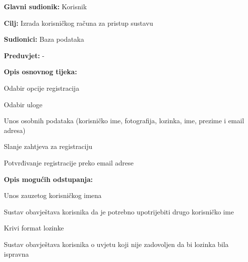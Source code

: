 					\noindent {}
					\begin{packed_item}
						
						\item \textbf{Glavni sudionik: }Korisnik
						\item  \textbf{Cilj:} Izrada korisničkog računa za pristup sustavu
						\item  \textbf{Sudionici:} Baza podataka
						\item  \textbf{Preduvjet:} -
						\item  \textbf{Opis osnovnog tijeka:}
						
						\item[] \begin{packed_enum}
							
							\item Odabir opcije registracija
							\item Odabir uloge
							\item Unos osobnih podataka (korisničko ime, fotografija, lozinka, ime, prezime i email adresa)
							\item Slanje zahtjeva za registraciju
							\item Potvrđivanje registracije preko email adrese
						
								\end{packed_enum}
								
						\item  \textbf{Opis mogućih odstupanja:}
						
						\item[] \begin{packed_item}
							
							\item[3.a] Unos zauzetog korisničkog imena \begin{packed_enum}
								
								\item Sustav obavještava korisnika da je potrebno upotrijebiti drugo korisničko ime
								
								\end{packed_enum}
							
							\item[3.b] Krivi format lozinke \begin{packed_enum}
								
								\item Sustav obavještava korisnika o uvjetu koji nije zadovoljen da bi lozinka bila ispravna
								

\end{packed_enum}
\end{packed_item}
\end{packed_item}
